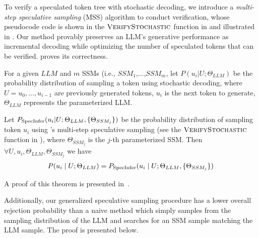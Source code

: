 To verify a speculated token tree with stochastic decoding, we introduce a {\em multi-step speculative sampling} (MSS) algorithm to conduct verification, whose pseudocode code is shown in the $\textproc{VerifyStochastic}$ function in  and illustrated in .
Our method provably preserves an LLM's generative performance as incremental decoding while optimizing the number of speculated tokens that can be verified.
 proves its correctness.

\begin{theorem}
\label{thm:stochastic_sampling}
For a given $LLM$ and $m$ SSMs (i.e., $SSM_1$,...,$SSM_m$, let $P(u_i | U; \Theta_{LLM})$ be the probability distribution of sampling a token using stochastic decoding, where $U = u_0,...,u_{i-1}$ are previously generated tokens, $u_i$ is the next token to generate, $\Theta_{LLM}$ represents the parameterized LLM. 

Let $P_{\rm{SpecInfer}}(u_i | U; \Theta_{LLM}, \{\Theta_{SSM_j}\})$ be the probability distribution of sampling token $u_i$ using \Sys's multi-step speculative sampling (see the $\textproc{VerifyStochastic}$ function in ), where $\Theta_{SSM_j}$ is the $j$-th parameterized SSM. Then $ \forall U, u_i, \Theta_{LLM}, \Theta_{SSM_j}$ we have
\begin{eqnarray}
P(u_i \mid U; \Theta_{LLM}) = P_{\rm{SpecInfer}}(u_i \mid U; \Theta_{LLM}, \{\Theta_{SSM_j}\})
\end{eqnarray}
\end{theorem}

A proof of this theorem is presented in~\cite{miao2023specinfer}.

Additionally, our generalized speculative sampling procedure has a lower overall rejection probability than a naive method which simply samples from the sampling distribution of the LLM and searches for an SSM sample matching the LLM sample. The proof is presented below.
\fi


